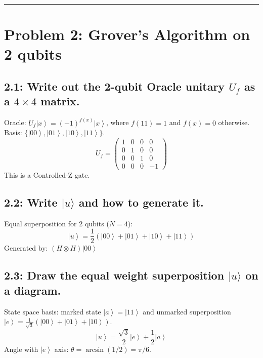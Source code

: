 \documentclass[11pt]{article}
\newcommand{\ket}[1]{\left|{#1}\right\rangle}
\begin{document}
\hrule\vspace{1em}

\section*{Problem 2: Grover's Algorithm on 2 qubits}

\subsection*{2.1: Write out the 2-qubit Oracle unitary $U_f$ as a $4 \times 4$ matrix.}
Oracle: $U_f\ket{x} = (-1)^{f(x)}\ket{x}$, where $f(11)=1$ and $f(x)=0$ otherwise. Basis: $\{\ket{00}, \ket{01}, \ket{10}, \ket{11}\}$.
$$
U_f = \begin{pmatrix} 1 & 0 & 0 & 0 \\ 0 & 1 & 0 & 0 \\ 0 & 0 & 1 & 0 \\ 0 & 0 & 0 & -1 \end{pmatrix}
$$
This is a Controlled-Z gate.

\subsection*{2.2: Write $|u\rangle$ and how to generate it.}
Equal superposition for 2 qubits ($N=4$):
$$
\ket{u} = \frac{1}{2}(\ket{00} + \ket{01} + \ket{10} + \ket{11})
$$
Generated by: $(H \otimes H) \ket{00}$

\subsection*{2.3: Draw the equal weight superposition $|u\rangle$ on a diagram.}
State space basis: marked state $\ket{a} = \ket{11}$ and unmarked superposition $\ket{e} = \frac{1}{\sqrt{3}}(\ket{00} + \ket{01} + \ket{10})$.
$$
\ket{u} = \frac{\sqrt{3}}{2}\ket{e} + \frac{1}{2}\ket{a}
$$
Angle with $\ket{e}$ axis: $\theta = \arcsin(1/2) = \pi/6$.

\begin{center}
\end{center}
\end{document}
